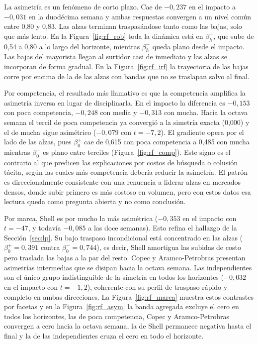 \documentclass[11pt]{article}
\begin{document}
La asimetría es un fenómeno de corto plazo. Cae de $-0{,}237$ en el impacto
a $-0{,}031$ en la duodécima semana y ambas respuestas convergen a un nivel
común entre 0,80 y 0,83. Las alzas terminan traspasándose tanto como las
bajas, solo que más lento. En la Figura~\ref{fig:rf_rob} toda la dinámica
está en $\beta_h^{+}$, que sube de 0,54 a 0,80 a lo largo del horizonte,
mientras $\beta_h^{-}$ queda plano desde el impacto. Las bajas del mayorista
llegan al surtidor casi de inmediato y las alzas se incorporan de forma
gradual. En la Figura~\ref{fig:rf_irf} la trayectoria de las bajas corre por
encima de la de las alzas con bandas que no se traslapan salvo al final.

Por competencia, el resultado más llamativo es que la competencia amplifica
la asimetría inversa en lugar de disciplinarla. En el impacto la diferencia
es $-0{,}153$ con poca competencia, $-0{,}248$ con media y $-0{,}313$ con
mucha. Hacia la octava semana el tercil de poca competencia ya convergió a
la simetría exacta (0,000) y el de mucha sigue asimétrico ($-0{,}079$ con $t
= -7{,}2$). El gradiente opera por el lado de las alzas, pues $\beta_0^{+}$
cae de 0,615 con poca competencia a 0,485 con mucha mientras $\beta_0^{-}$
es plano entre terciles (Figura~\ref{fig:rf_comp}). Este signo es el
contrario al que predicen las explicaciones por costos de búsqueda o
colusión tácita, según las cuales más competencia debería reducir la
asimetría. El patrón es direccionalmente consistente con una renuencia a
liderar alzas en mercados densos, donde subir primero es más costoso en
volumen, pero con estos datos esa lectura queda como pregunta abierta y no
como conclusión.

Por marca, Shell es por mucho la más asimétrica ($-0{,}353$ en el impacto
con $t = -47$, y todavía $-0{,}085$ a las doce semanas). Esto refina el
hallazgo de la Sección~\ref{sec:lp}. Su bajo traspaso incondicional está
concentrado en las alzas ($\beta_0^{+} = 0{,}391$ contra $\beta_0^{-} =
0{,}744$), es decir, Shell amortigua las subidas de costo pero traslada las
bajas a la par del resto. Copec y Aramco-Petrobras presentan asimetrías
intermedias que se disipan hacia la octava semana. Las independientes son el
único grupo indistinguible de la simetría en todos los horizontes
($-0{,}032$ en el impacto con $t = -1{,}2$), coherente con su perfil de
traspaso rápido y completo en ambas direcciones. La
Figura~\ref{fig:rf_marca} muestra estos contrastes por facetas y en la
Figura~\ref{fig:rf_asym} la banda agregada excluye el cero en todos los
horizontes, las de poca competencia, Copec y Aramco-Petrobras convergen a
cero hacia la octava semana, la de Shell permanece negativa hasta el final y
la de las independientes cruza el cero en todo el horizonte.
\end{document}
